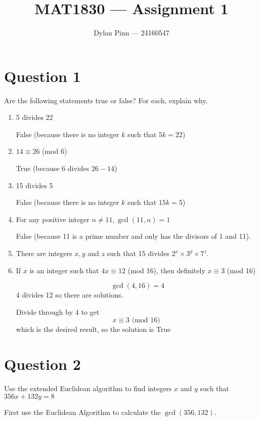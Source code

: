 \documentclass[11pt]{article}
\begin{document}
\title{MAT1830 --- Assignment 1}
\author{Dylan Pinn --- 24160547}
\maketitle

\section*{Question 1}
Are the following statements true or false? For each, explain why.
\begin{enumerate}[label= (\alph*)]
\item 5 divides 22

	False (because there is no integer $k$ such that $5k = 22$)

\item $14 \equiv 26$ (mod 6)

	True (because 6 divides $26 - 14$)

\item 15 divides 5

	False (because there is no integer $k$ such that $15k = 5$)

\item For any positive integer $n \neq 11, \gcd(11, n) = 1$

	False (because 11 is a prime number and only has the divisors of 1 and 11).

\item There are integers $x, y$ and $z$ such that 15 divides $2^x \times 3^y
  \times 7^z$.


\item If $x$ is an integer such that $4x \equiv 12$ (mod 16), then definitely $x
  \equiv 3$ (mod 16)

	$$\gcd(4, 16) = 4$$
	4 divides 12 so there are solutions.
	
	Divide through by 4 to get $$x \equiv 3 \text{ (mod 16) }$$ which is the 
	desired result, so the solution is True

\end{enumerate}

\section*{Question 2}
Use the extended Euclidean algorithm to find integers $x$ and $y$ such that
$356x + 132y = 8$

First use the Euclidean Algorithm to calculate the $\gcd(356,132)$.
\end{document}
